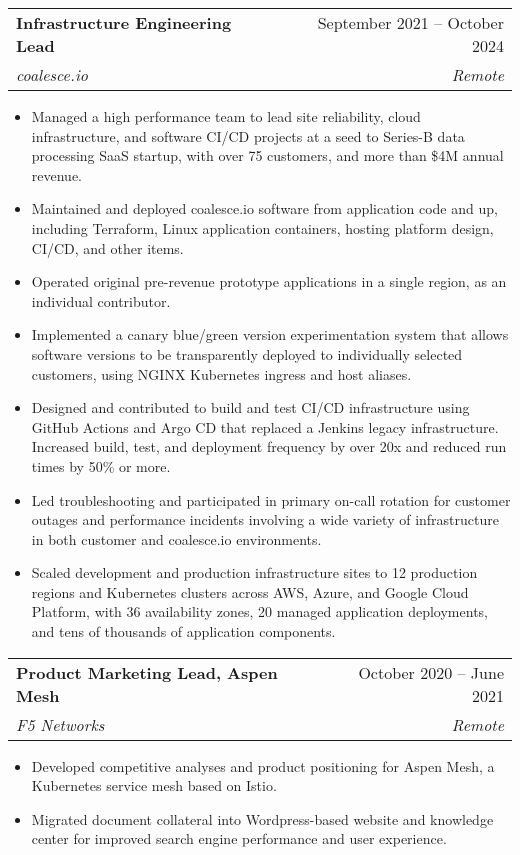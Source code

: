 \documentclass[letterpaper,11pt]{article}
\makeatletter
\newcommand{\resumeItem}[1]{
  \item\footnotesize{
    {#1 \vspace{-2pt}}
  }
}
\newcommand{\resumeSubheading}[4]{
  \vspace{-2pt}\item
    \begin{tabular*}{0.97\textwidth}[t]{l@{\extracolsep{\fill}}r}
      \textbf{\small#1} & \small#2 \\
      \textit{\small#3} & \textit{\small #4} \\
    \end{tabular*}\vspace{-7pt}
}
\newcommand{\resumeSubSubheading}[2]{
    \item
    \begin{tabular*}{0.97\textwidth}{l@{\extracolsep{\fill}}r}
      \textit{\small#1} & \textit{\small #2} \\
    \end{tabular*}\vspace{-7pt}
}
\newcommand{\resumeSubHeadingListEnd}{\end{itemize}}
\newcommand{\resumeItemListStart}{\begin{itemize}}
\newcommand{\resumeItemListEnd}{\end{itemize}\vspace{-5pt}}
\makeatother
\begin{document}
    \resumeSubheading
      {Infrastructure Engineering Lead}{September 2021 -- October 2024}
      {coalesce.io}{Remote}
      \resumeItemListStart
        \resumeItem{Managed a high performance team to lead site reliability, cloud infrastructure, and software CI/CD projects at a seed to Series-B data processing SaaS startup, with over 75 customers, and more than \$4M annual revenue.}
        \resumeItem{Maintained and deployed coalesce.io software from application code and up, including Terraform, Linux application containers, hosting platform design, CI/CD, and other items.}
        \resumeItem{Operated original pre-revenue prototype applications in a single region, as an individual contributor.}
        \resumeItem{Implemented a canary blue/green version experimentation system that allows software versions to be transparently deployed to individually selected customers, using NGINX Kubernetes ingress and host aliases.}
        \resumeItem{Designed and contributed to build and test CI/CD infrastructure using GitHub Actions and Argo CD that replaced a Jenkins legacy infrastructure. Increased build, test, and deployment frequency by over 20x and reduced run times by 50\% or more.}
        \resumeItem{Led troubleshooting and participated in primary on-call rotation for customer outages and performance incidents involving a wide variety of infrastructure in both customer and coalesce.io environments.}
        \resumeItem{Scaled development and production infrastructure sites to 12 production regions and Kubernetes clusters across AWS, Azure, and Google Cloud Platform, with 36 availability zones, 20 managed application deployments, and tens of thousands of application components.}
      \resumeItemListEnd
      

    \resumeSubheading
      {Product Marketing Lead, Aspen Mesh}{October 2020 -- June 2021}
      {F5 Networks}{Remote}
      \resumeItemListStart
        \resumeItem{Developed competitive analyses and product positioning for Aspen Mesh, a Kubernetes service mesh based on Istio.}
        \resumeItem{Migrated document collateral into Wordpress-based website and knowledge center for improved search engine performance and user experience.}
      \resumeItemListEnd
\end{document}
